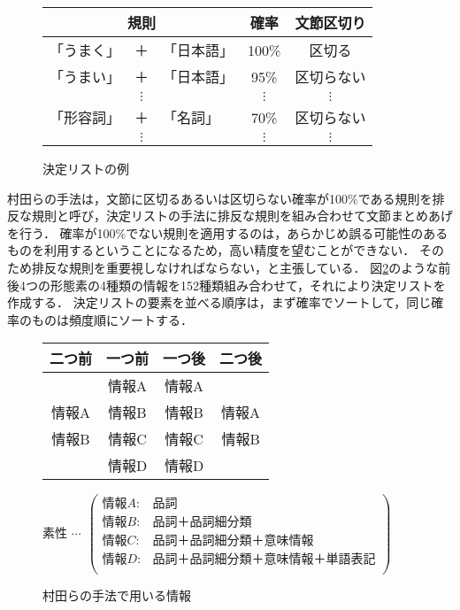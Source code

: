 \begin{figure}
  \begin{center}
    \begin{tabular}{r@{ }c@{ }l|c|c}
      \multicolumn{3}{c|}{規則} & 確率 & 文節区切り\\
      \hline
      「うまく」 & ＋ & 「日本語」 & 100\% & 区切る\\
      「うまい」 & ＋ & 「日本語」 &  95\% & 区切らない\\
      & $\vdots$ & & $\vdots$ & $\vdots$\\
      「形容詞」 & ＋ & 「名詞」   &  70\% & 区切らない\\
      & $\vdots$ & & $\vdots$ & $\vdots$\\
    \end{tabular}
    \caption{決定リストの例}
    
    
    
    \label{fig:決定リスト}
  \end{center}
\end{figure}

村田らの手法は，文節に区切るあるいは区切らない確率が100\%である規則を排反な規則と呼び，決定リストの手法に排反な規則を組み合わせて文節まとめあげを行う．
確率が100\%でない規則を適用するのは，あらかじめ誤る可能性のあるものを利用するということになるため，高い精度を望むことができない．
そのため排反な規則を重要視しなければならない，と主張している．
図\ref{fig:村田手法}のような前後4つの形態素の4種類の情報を152種類組み合わせて，それにより決定リストを作成する．
決定リストの要素を並べる順序は，まず確率でソートして，同じ確率のものは頻度順にソートする．

\begin{figure}
  \begin{center}
    \begin{tabular}{cccc}
      二つ前 & 一つ前  & 一つ後 & 二つ後\\
      \hline
            & 情報A & 情報A &\\
      情報A & 情報B & 情報B & 情報A\\
      情報B & 情報C & 情報C & 情報B\\
            & 情報D & 情報D &\\
    \end{tabular}

    素性 
    $ \cdots ~~ \left(
      \begin{array}{ll}
        情報A: & 品詞\\
        情報B: & 品詞＋品詞細分類\\
        情報C: & 品詞＋品詞細分類＋意味情報\\
        情報D: & 品詞＋品詞細分類＋意味情報＋単語表記\\
      \end{array}
      \right)
    $
    \caption{村田らの手法で用いる情報}
    
    
    
    \label{fig:村田手法}
  \end{center}
\end{figure}

